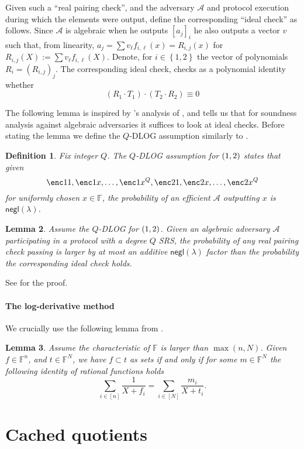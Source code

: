 \documentclass[11pt]{article} %
\newcommand{\F}{\ensuremath{\mathbb F}\xspace}
\newcommand{\adv}{\ensuremath{\mathcal A}\xspace}
\newcommand{\negl}{\ensuremath{\mathsf{negl}(\lambda)}\xspace}
\newcommand{\defeq}{:=}
\newcommand{\enci}[1]{\ensuremath{\left[#1\right]_i}\xspace}
\newcommand{\set}[1]{\ensuremath{\left\{#1\right\}}\xspace}
\newcommand{\sumi}[1]{\sum_{i\in[#1]}}
\newtheorem{lemma}{Lemma}[section]
\newtheorem{dfn}[lemma]{Definition}
\newcommand{\witsize}{\ensuremath{n}\xspace}
\newcommand{\tabsize}{\ensuremath{N}\xspace}
\begin{document}
Given such a ``real pairing check'', and the adversary \adv and protocol execution during which the elements were output, define the corresponding ``ideal check'' as follows.
Since \adv is algebraic when he outputs \enci{a_j} he also outputs a vector $v$ such that, from linearity, $a_j = \sum v_\ell f_{i,\ell}(x)=R_{i,j}(x)$ for $R_{i,j}(X) \defeq \sum v_\ell f_{i,\ell}(X)$.
Denote, for $i\in \set{1,2}$ the vector of polynomials $R_i=(R_{i,j})_j$.
The corresponding ideal check, checks as a polynomial identity whether
\[(R_1 \cdot T_1)\cdot (T_2\cdot R_2) \equiv 0\]


The following lemma is inspired by \cite{AGM}'s analysis of \cite{Groth16},
and tells us that for soundness analysis against algebraic adversaries it suffices to look at ideal checks.
Before stating the lemma we define the $Q$-DLOG assumption similarly to \cite{AGM}.
\begin{dfn}\label{ref:qdlog}
 Fix integer $Q$. The \emph{$Q$-DLOG assumption for $(\G1,\G2)$} states that given 
 \[\enc1{1},\enc1{x},\ldots,\enc1{x^Q},\enc2{1},\enc2{x},\ldots,\enc2{x^Q}\]
 for uniformly chosen $x\in \F$, the probability of an efficient \adv outputting $x$
 is \negl.
\end{dfn}



\begin{lemma}\label{lem:AGManalysis}
Assume the $Q$-DLOG for $(\G1,\G2)$.
 Given an algebraic adversary \adv participating in a protocol with a degree $Q$ SRS,
 the probability of any real pairing check passing is larger by at most an additive \negl factor than the probability the corresponding ideal check holds.
\end{lemma}
See \cite{plonk} for the proof.

\paragraph{The log-derivative method}
We crucially use the following lemma from \cite{mvlookup}.
\begin{lemma}\label{lem:mvlookup}
 Assume the characteristic of \F is larger than $\max(n,N)$. Given $f\in \F^\witsize$, and $t\in \F^\tabsize$,
 we have $f\subset t$ as sets if and only if for some $m\in \F^\tabsize$ the following identity of rational functions holds
 \[\sumi{\witsize}\frac{1}{X+f_i}=\sumi{\tabsize}\frac{m_i}{X+t_i}.\]
\end{lemma}

\section{Cached quotients}\label{sec:cachedquo}
\end{document}
